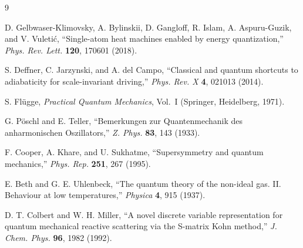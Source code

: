 \documentclass[11pt]{article}
\numberwithin{equation}{section}
\begin{document}
\begin{thebibliography}{9}

D. Gelbwaser-Klimovsky, A. Bylinskii, D. Gangloff, R. Islam, A. Aspuru-Guzik, and V. Vuleti\'c, ``Single-atom heat machines enabled by energy quantization,'' \emph{Phys. Rev. Lett.} \textbf{120}, 170601 (2018).

S. Deffner, C. Jarzynski, and A. del Campo, ``Classical and quantum shortcuts to adiabaticity for scale-invariant driving,'' \emph{Phys. Rev. X} \textbf{4}, 021013 (2014).

S. Fl\"ugge, \emph{Practical Quantum Mechanics}, Vol.~I (Springer, Heidelberg, 1971).

G. P\"oschl and E. Teller, ``Bemerkungen zur Quantenmechanik des anharmonischen Oszillators,'' \emph{Z. Phys.} \textbf{83}, 143 (1933).

F. Cooper, A. Khare, and U. Sukhatme, ``Supersymmetry and quantum mechanics,'' \emph{Phys. Rep.} \textbf{251}, 267 (1995).

E. Beth and G. E. Uhlenbeck, ``The quantum theory of the non-ideal gas. II. Behaviour at low temperatures,'' \emph{Physica} \textbf{4}, 915 (1937).

D. T. Colbert and W. H. Miller, ``A novel discrete variable representation for quantum mechanical reactive scattering via the S-matrix Kohn method,'' \emph{J. Chem. Phys.} \textbf{96}, 1982 (1992).

\end{thebibliography}
\end{document}
